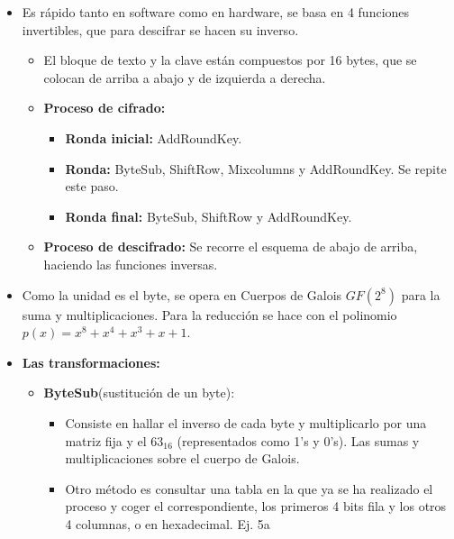 \documentclass[12pt, twoside, openright]{report} %
\begin{document}
\begin{itemize}
\begin{itemize}
    \item Es rápido tanto en software como en hardware, se basa en 4
      funciones invertibles, que para descifrar se hacen su inverso.
      

      \begin{itemize}
      \item El bloque de texto y la clave están compuestos por 16 bytes, que
        se colocan de arriba a abajo y de izquierda a derecha.
        
      \item \textbf{Proceso de cifrado:}
        

        \begin{itemize}
        \item \textbf{Ronda inicial:} AddRoundKey.
          
        \item \textbf{Ronda:} ByteSub, ShiftRow, Mixcolumns y AddRoundKey.
          Se repite este paso.
          
        \item \textbf{Ronda final:} ByteSub, ShiftRow y AddRoundKey.
          
        \end{itemize}
      \item \textbf{Proceso de descifrado:} Se recorre el esquema de abajo
        de arriba, haciendo las funciones inversas.
        
      \end{itemize}
    \item Como la unidad es el byte, se opera en Cuerpos de Galois $GF(2^8)$
      para la suma y multiplicaciones. Para la reducción se hace con el
      polinomio $p(x)=x^8+x^4+x^3+x+1$.
      
    \item \textbf{Las transformaciones:}
      

      \begin{itemize}
      \item \textbf{ByteSub}(sustitución de un byte):
        

        \begin{itemize}
        \item Consiste en hallar el inverso de cada byte y multiplicarlo por
          una matriz fija y el $63_{16}$ (representados como 1's y 0's). Las
          sumas y multiplicaciones sobre el cuerpo de Galois.
          
        \item Otro método es consultar una tabla en la que ya se ha
          realizado el proceso y coger el correspondiente, los primeros
          4 bits fila y los otros 4 columnas, o en hexadecimal. Ej. 5a
          

\end{itemize}
\end{itemize}
\end{itemize}
\end{itemize}
\end{document}
